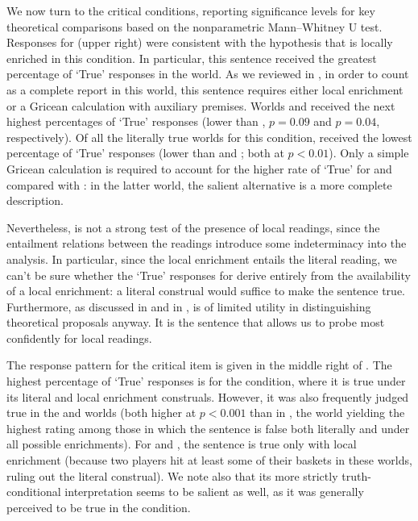 \documentclass[leqno,12pt]{article}
\begin{document}

We now turn to the critical conditions, reporting significance levels
for key theoretical comparisons based on the nonparametric
Mann--Whitney U test. Responses for  (upper right)
were consistent with the hypothesis that  is locally
enriched in this condition. In particular, this sentence received the
greatest percentage of `True' responses in the  world. As
we reviewed in , in order to count as a
complete report in this world, this sentence requires either local
enrichment or a Gricean calculation with auxiliary premises. Worlds
 and  received the next highest percentages of
`True' responses (lower than , $p = 0.09$ and $p = 0.04$,
respectively). Of all the literally true worlds for this condition,
 received the lowest percentage of `True' responses (lower
than  and ; both at $p < 0.01$).  Only a simple
Gricean calculation is required to account for the higher rate of
`True' for  and  compared with : in
the latter world, the salient alternative  is a more complete description.

Nevertheless,  is not a strong test of the
presence of local readings, since the entailment relations between the
readings introduce some indeterminacy into the analysis. In
particular, since the local enrichment entails the literal reading, we
can't be sure whether the `True' responses for  derive
entirely from the availability of a local enrichment: a literal
construal would suffice to make the sentence true. Furthermore, as
discussed in  and in
\citeauthor{Chemla:Spector:2011},  is of limited
utility in distinguishing theoretical proposals anyway. It is the
 sentence that allows us to probe most
confidently for local readings.

The response pattern for the critical item 
is given in the middle right of . The
highest percentage of `True' responses is for the 
condition, where it is true under its literal and local enrichment
construals. However, it was also frequently judged true in the
 and  worlds (both higher at $p < 0.001$ than in
, the world yielding the highest rating among those in
which the sentence is false both literally and under all possible
enrichments). For  and , the sentence is true
only with local enrichment (because two players hit at least some of
their baskets in these worlds, ruling out the literal construal).  We
note also that its more strictly truth-conditional interpretation
seems to be salient as well, as it was generally perceived to be true
in the  condition.
\end{document}

